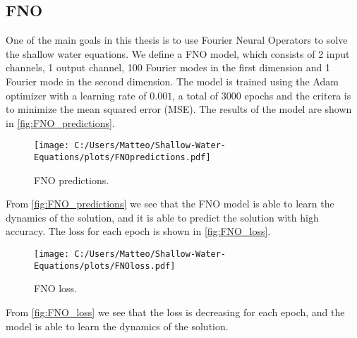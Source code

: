 \subsection{FNO}
One of the main goals in this thesis is to use Fourier Neural Operators to solve the shallow water equations.
We define a FNO model, which consists of 2 input channels, 1 output channel, 100 Fourier modes in the first dimension and 1 Fourier mode in the second dimension.
The model is trained using the Adam optimizer with a learning rate of $0.001$, a total of $3000$ epochs and the critera is to minimize the mean squared error (MSE).
The results of the model are shown in \autoref{fig:FNO_predictions}.
\begin{figure}[H]
    \centering
    \texttt{[image: C:/Users/Matteo/Shallow-Water-Equations/plots/FNOpredictions.pdf]}
    \caption{FNO predictions.}\label{fig:FNO_predictions}
\end{figure}
From \autoref{fig:FNO_predictions} we see that the FNO model is able to learn the dynamics of the solution, and it is able to predict the solution with high accuracy.
The loss for each epoch is shown in \autoref{fig:FNO_loss}.
\begin{figure}[H]
    \centering
    \texttt{[image: C:/Users/Matteo/Shallow-Water-Equations/plots/FNOloss.pdf]}
    \caption{FNO loss.}\label{fig:FNO_loss}
\end{figure}
From \autoref{fig:FNO_loss} we see that the loss is decreasing for each epoch, and the model is able to learn the dynamics of the solution.


